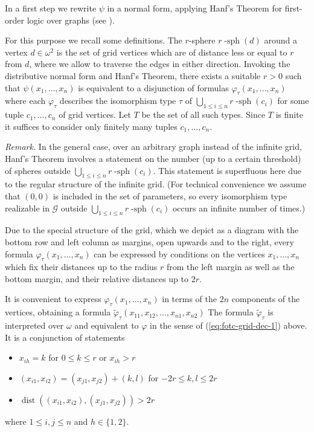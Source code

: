 \documentclass{LMCS}
\renewcommand{\phi}{\varphi}
\DeclareMathOperator{\sph}{-sph}
\DeclareMathOperator{\dist}{dist}
\begin{document}
In a first step we rewrite $\psi$ in a normal form, applying Hanf's Theorem for
first-order logic over graphs (see \cite{ha65,ef95,tho97a}).

For this purpose we recall some definitions. The $r$-sphere $r\sph(d)$
around a vertex $d \in \omega^2$ is the set of grid vertices which are of distance 
less or equal to $r$ from $d$, where we allow to traverse the edges in
either direction. Invoking the distributive normal form and Hanf's Theorem,
there exists a suitable $r >0$ such that $\psi(x_1,\ldots,x_n)$ is equivalent 
to a disjunction of formulas $\phi_\tau(x_1,\ldots,x_n)$ where each 
$\phi_\tau$ describes the isomorphism type $\tau$ of $\bigcup_{1 \le i \le n}
r\sph(c_i)$ for some tuple $c_1,\ldots,c_n$ of grid vertices. 
Let $T$ be the set of all such types. Since $T$ is finite
it suffices to consider only finitely many  tuples $c_1,\ldots,c_n$.

\emph{Remark.} In the general case, over an arbitrary graph instead of the 
infinite grid, Hanf's Theorem involves a statement on the number (up to a certain 
threshold) of spheres outside $\bigcup_{1 \le i \le n} r\sph(c_i)$. This 
statement is superfluous here due to the regular structure of the infinite grid.
(For technical convenience we assume that $(0,0)$ is included in the set of 
parameters, so every isomorphism type realizable in $\mathcal G$ outside 
$\bigcup_{1 \le i \le n} r\sph(c_i)$ occurs an infinite number of times.)

Due to the special structure of the grid, which we depict as a diagram 
with the bottom row and left column as margins, open upwards and 
to the right, every formula 
$\phi_\tau(x_1,\ldots, x_n)$ can be expressed by conditions on the vertices
$x_1,\ldots,x_n$ which fix their distances up to the radius $r$ from the
left margin as well as the bottom margin, and their relative distances up to $2r$.

It is convenient to express $\phi_\tau(x_1,\ldots,x_n)$ in terms of the $2n$
components of the vertices, obtaining a formula 
$\tilde \phi_\tau(x_{11},x_{12},\ldots,x_{n1},x_{n2})$
The formula $\tilde \phi_\tau$ is interpreted over $\omega$ and equivalent to $\phi$ in 
the sense of (\ref{eq:fotc-grid-dec-1}) above. It is a conjunction of statements

\begin{itemize}
\item $x_{ih}=k$ for $ 0 \le k \le r$ or $x_{ih} >r$
\item $(x_{i1},x_{i2}) = (x_{j1},x_{j2}) + (k,l)$ for $-2r \le k,l \le 2r$
\item $\dist((x_{i1},x_{i2}),(x_{j1},x_{j2})) >2r$
\end{itemize}
where $1 \le i,j \le n$ and $h \in \{1,2\}$. 
\end{document}
